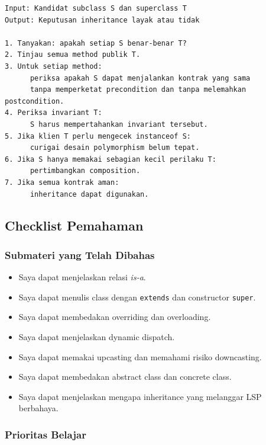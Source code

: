 \begin{lstlisting}[caption={Pseudocode validasi inheritance}, label={lst:validasi-inheritance}]
Input: Kandidat subclass S dan superclass T
Output: Keputusan inheritance layak atau tidak

1. Tanyakan: apakah setiap S benar-benar T?
2. Tinjau semua method publik T.
3. Untuk setiap method:
      periksa apakah S dapat menjalankan kontrak yang sama
      tanpa memperketat precondition dan tanpa melemahkan postcondition.
4. Periksa invariant T:
      S harus mempertahankan invariant tersebut.
5. Jika klien T perlu mengecek instanceof S:
      curigai desain polymorphism belum tepat.
6. Jika S hanya memakai sebagian kecil perilaku T:
      pertimbangkan composition.
7. Jika semua kontrak aman:
      inheritance dapat digunakan.
\end{lstlisting}

\subsection{Checklist Pemahaman}

\subsubsection{Submateri yang Telah Dibahas}

\begin{itemize}
    \item[$\square$] Saya dapat menjelaskan relasi \textit{is-a}.
    \item[$\square$] Saya dapat menulis class dengan \texttt{extends} dan constructor \texttt{super}.
    \item[$\square$] Saya dapat membedakan overriding dan overloading.
    \item[$\square$] Saya dapat menjelaskan dynamic dispatch.
    \item[$\square$] Saya dapat memakai upcasting dan memahami risiko downcasting.
    \item[$\square$] Saya dapat membedakan abstract class dan concrete class.
    \item[$\square$] Saya dapat menjelaskan mengapa inheritance yang melanggar LSP berbahaya.
\end{itemize}

\subsubsection{Prioritas Belajar}

